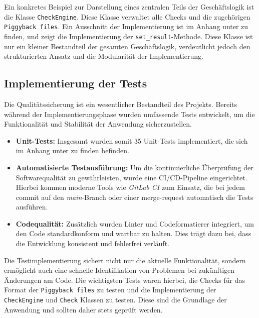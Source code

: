 \noindent
Ein konkretes Beispiel zur Darstellung eines zentralen Teils der Geschäftslogik ist die Klasse \texttt{CheckEngine}.
Diese Klasse verwaltet alle Checks und die zugehörigen \texttt{Piggyback files}.
Ein Ausschnitt der Implementierung ist im Anhang unter  zu finden, und zeigt die Implementierung der \texttt{set\_result}-Methode.
Diese Klasse ist nur ein kleiner Bestandteil der gesamten Geschäftslogik, verdeutlicht jedoch den strukturierten Ansatz und die Modularität der Implementierung.

\subsection{Implementierung der Tests}
Die Qualitätssicherung ist ein wesentlicher Bestandteil des Projekts.
Bereits während der Implementierungsphase wurden umfassende Tests entwickelt, um die Funktionalität und Stabilität der Anwendung sicherzustellen.

\begin{itemize}
  \item \textbf{Unit-Tests:} Insgesamt wurden somit 35 Unit-Tests implementiert, die sich im Anhang unter  zu finden befinden.
  \item \textbf{Automatisierte Testausführung:} Um die kontinuierliche Überprüfung der Softwarequalität zu gewährleisten, wurde eine CI/CD-Pipeline eingerichtet.
    Hierbei kommen moderne Tools wie \textit{GitLab CI} zum Einsatz, die bei jedem \Gls{commit} auf den \textit{main}-Branch oder einer \Gls{merge-request} automatisch die Tests ausführen.
  \item \textbf{Codequalität:} Zusätzlich wurden Linter und Codeformatierer integriert, um den Code standardkonform und wartbar zu halten.
    Dies trägt dazu bei, dass die Entwicklung konsistent und fehlerfrei verläuft.
\end{itemize}

\noindent
Die Testimplementierung sichert nicht nur die aktuelle Funktionalität, sondern ermöglicht auch eine schnelle Identifikation von Problemen bei zukünftigen Änderungen am Code.
Die wichtigsten Tests waren hierbei, die Checks für das Format der \texttt{Piggyback files} zu testen und die Implementierung der \texttt{CheckEngine} und \texttt{Check} Klassen zu testen.
Diese sind die Grundlage der Anwendung und sollten daher stets geprüft werden.

